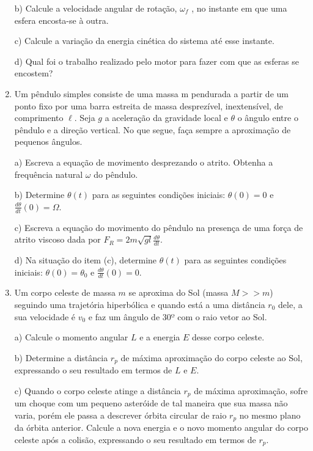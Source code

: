 \begin{enumerate}[start=1,label={\bfseries Q\arabic*.}]
\resposta

b) Calcule a velocidade angular de rotação, $\omega_{f}$ , no instante em que uma esfera encosta-se à outra.

\resposta

c) Calcule a variação da energia cinética do sistema até esse instante.

\resposta

d) Qual foi o trabalho realizado pelo motor para fazer com que as esferas se encostem?

\resposta


\item Um pêndulo simples consiste de uma massa m pendurada a partir de um ponto fixo por uma barra estreita de massa desprezível, inextensível, de comprimento $\ell$. Seja $g$ a aceleração da gravidade local e $\theta$ o ângulo entre o pêndulo e a direção vertical. No que segue, faça sempre a aproximação de pequenos ângulos.

a) Escreva a equação de movimento desprezando o atrito. Obtenha a frequência natural $\omega$ do pêndulo.

\resposta

b) Determine $\theta(t)$ para as seguintes condições iniciais: $\theta(0)=0$ e $\frac{d \theta}{d t}(0)=\Omega$.

\resposta

c) Escreva a equação do movimento do pêndulo na presença de uma força de atrito viscoso dada por $F_{R}=2 m \sqrt{g l} \frac{d \theta}{d t}$.

\resposta

d) Na situação do item (c), determine $\theta (t)$ para as seguintes condições iniciais: $\theta(0) = \theta_{0}$ e $\frac{d\theta}{dt} (0) = 0$.

\resposta


\item Um corpo celeste de massa $m$ se aproxima do Sol (massa $M >> m$) seguindo uma trajetória hiperbólica e quando está a uma distância $r_{0}$ dele, a sua velocidade é $v_{0}$ e faz um ângulo de $30º$ com o raio vetor ao Sol.

a) Calcule o momento angular $L$ e a energia $E$ desse corpo celeste.

\resposta

b) Determine a distância $r_{p}$ de máxima aproximação do corpo celeste ao Sol, expressando o seu resultado em termos de $L$ e $E$.

\resposta

c) Quando o corpo celeste atinge a distância $r_{p}$ de máxima aproximação, sofre um choque com um pequeno asteróide de tal maneira que sua massa não varia, porém ele passa a descrever órbita circular de raio $r_{p}$ no mesmo plano da órbita anterior. Calcule a nova energia e o novo momento angular do corpo celeste após a colisão, expressando o seu resultado em termos de $r_{p}$.


\end{enumerate}
